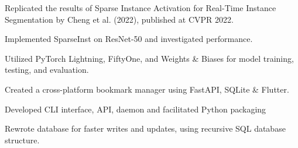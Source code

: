 \documentclass[]{resume-template}
\begin{document}
\begin{minipage}[t]{0.66\textwidth}
  \label{subsec:sparseinst}
  \begin{tightemize}
  \item Replicated the results of Sparse Instance Activation for Real-Time Instance Segmentation by Cheng et al. (2022), published at CVPR 2022.
  \item Implemented SparseInst on ResNet-50 and investigated performance.
  \item Utilized PyTorch Lightning, FiftyOne, and Weights \& Biases for model training, testing, and evaluation.

  \end{tightemize}
  \label{subsec: Bookie}
  \begin{tightemize}
  \item Created a cross-platform bookmark manager using FastAPI, SQLite \& Flutter.
  \item Developed CLI interface, API, daemon and facilitated Python packaging
  \item Rewrote database for faster writes and updates, using recursive SQL database structure. \\
  \end{tightemize}


\end{minipage}
\end{document}
